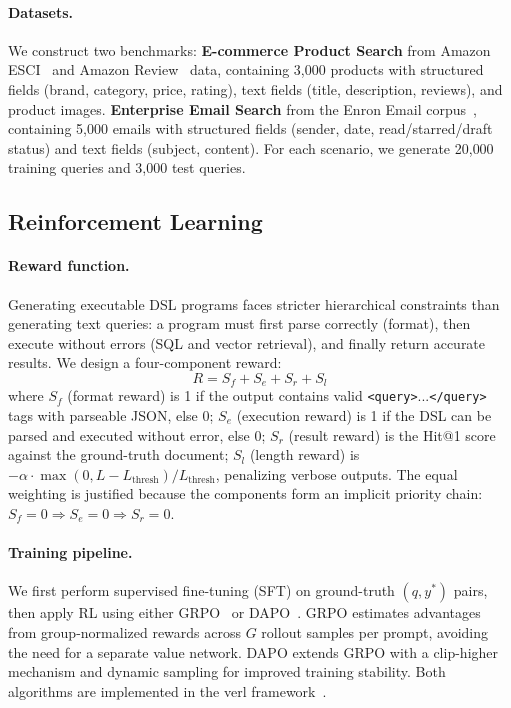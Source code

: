 \documentclass[11pt]{article}
\begin{document}
\paragraph{Datasets.}
We construct two benchmarks:
\textbf{E-commerce Product Search} from Amazon ESCI~\cite{reddy2022shopping} and Amazon Review~\cite{ni2019justifying} data, containing 3{,}000 products with structured fields (brand, category, price, rating), text fields (title, description, reviews), and product images.
\textbf{Enterprise Email Search} from the Enron Email corpus~\cite{klimt2004enron}, containing 5{,}000 emails with structured fields (sender, date, read/starred/draft status) and text fields (subject, content).
For each scenario, we generate 20{,}000 training queries and 3{,}000 test queries.


\subsection{Reinforcement Learning}
\label{sec:rl}

\paragraph{Reward function.}
Generating executable DSL programs faces stricter hierarchical constraints than generating text queries: a program must first parse correctly (format), then execute without errors (SQL and vector retrieval), and finally return accurate results.
We design a four-component reward:
\begin{equation}
R = S_f + S_e + S_r + S_l
\label{eq:reward}
\end{equation}
where $S_f$ (format reward) is 1 if the output contains valid \texttt{<query>}...\texttt{</query>} tags with parseable JSON, else 0;
$S_e$ (execution reward) is 1 if the DSL can be parsed and executed without error, else 0;
$S_r$ (result reward) is the Hit@1 score against the ground-truth document;
$S_l$ (length reward) is $-\alpha \cdot \max(0, L - L_\text{thresh}) / L_\text{thresh}$, penalizing verbose outputs.
The equal weighting is justified because the components form an implicit priority chain: $S_f = 0 \Rightarrow S_e = 0 \Rightarrow S_r = 0$.

\paragraph{Training pipeline.}
We first perform supervised fine-tuning (SFT) on ground-truth $(q, y^*)$ pairs, then apply RL using either GRPO~\cite{shao2024deepseekmath} or DAPO~\cite{yu2025dapo}.
GRPO estimates advantages from group-normalized rewards across $G$ rollout samples per prompt, avoiding the need for a separate value network.
DAPO extends GRPO with a clip-higher mechanism and dynamic sampling for improved training stability.
Both algorithms are implemented in the verl framework~\cite{sheng2024hybridflow}.
\end{document}
